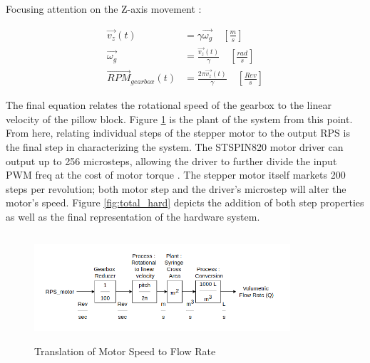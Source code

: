 \documentclass[journal]{IEEEtran}
\begin{document}
                Focusing attention on the Z-axis movement :
                
                \begin{equation}
                    \begin{split}
                        {\overrightarrow{v_z}(t)} &= \gamma \overrightarrow{\omega_g} \,\,\,\,\,\,\left [\frac{m}{s}\right] \\
                        \overrightarrow{\omega_g} &= \frac{{\overrightarrow{v_z}(t)}}{\gamma}
                        \,\,\,\,\,\,\left [\frac{rad}{s}\right] \\
                        {\overrightarrow{RPM}}_{gearbox}(t) &= \frac{2\pi {\overrightarrow{v_z}(t)}}{\gamma}
                        \,\,\,\,\,\,\left [\frac{Rev}{s}\right]
                    \end{split}
                \end{equation}
                
                The final equation relates the rotational speed of the gearbox to the linear velocity of the pillow block. Figure \ref{fig:rps_2_Q} is the plant of the system from this point. From here, relating individual steps of the stepper motor to the output RPS is the final step in characterizing the system. The STSPIN820 motor driver can output up to 256 microsteps, allowing the driver to further divide the input PWM freq at the cost of motor torque \cite{stepper_theory}. The stepper motor itself markets 200 steps per revolution; both motor step and the driver's microstep will alter the motor's speed. Figure \ref{fig:total_hard} depicts the addition of both step properties as well as the final representation of the hardware system.   
                
                \begin{figure}[H]
                    \centering
                    \includegraphics[width= 9.5cm, height = 4cm]{rps_2_Q}
                    \caption{Translation of Motor Speed to Flow Rate}
                    \label{fig:rps_2_Q}
                \end{figure}
                
\end{document}
